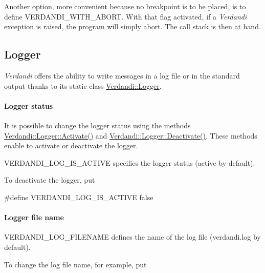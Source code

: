 \documentclass{tufte-book}
\begin{document}
\-Another option, more convenient because no breakpoint is to be placed, is to define {\ttfamily \-V\-E\-R\-D\-A\-N\-D\-I\-\_\-\-W\-I\-T\-H\-\_\-\-A\-B\-O\-R\-T}. \-With that flag activated, if a \-\emph{Verdandi} exception is raised, the program will simply abort. \-The call stack is then at hand.

\hypertarget{debugging_logger}{}\subsection{\-Logger}\label{debugging_logger}

\-\emph{Verdandi} offers the ability to write messages in a log file or in the standard output thanks to its static class {\ttfamily  \hyperlink{class_verdandi_1_1_logger}{\-Verdandi\-::\-Logger}}.

\hypertarget{debugging_logger_status}{}\paragraph{\-Logger status}\label{debugging_logger_status}


\-It is possible to change the logger status using the methods {\ttfamily  \hyperlink{class_verdandi_1_1_logger_a57ddb9e9bed114d33772f77f836f32de}{\-Verdandi\-::\-Logger\-::\-Activate()}} and {\ttfamily  \hyperlink{class_verdandi_1_1_logger_afbc87f7ddfd7a8ca1fd538877aaaaac7}{\-Verdandi\-::\-Logger\-::\-Deactivate()}}. \-These methods enable to activate or deactivate the logger.

{\ttfamily \-V\-E\-R\-D\-A\-N\-D\-I\-\_\-\-L\-O\-G\-\_\-\-I\-S\-\_\-\-A\-C\-T\-I\-V\-E} specifies the logger status (active by default).

\-To deactivate the logger, put

 \begin{frame_cpp}
#define VERDANDI_LOG_IS_ACTIVE false
\end{frame_cpp}

 \hypertarget{debugging_logger_file_name}{}\paragraph{\-Logger file name}\label{debugging_logger_file_name}


{\ttfamily \-V\-E\-R\-D\-A\-N\-D\-I\-\_\-\-L\-O\-G\-\_\-\-F\-I\-L\-E\-N\-A\-M\-E} defines the name of the log file ({\ttfamily verdandi.\-log} by default).

\-To change the log file name, for example, put
\end{document}
